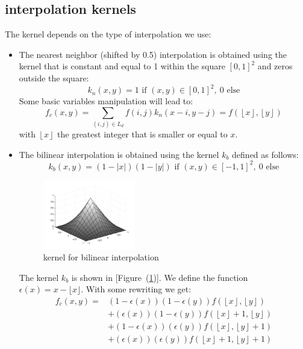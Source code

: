 \documentclass[11pt]{article}
\newcommand{\fig}[1]{[Figure~(#1)]}
\begin{document}
\subsection{interpolation kernels}

The kernel depends on the type of interpolation we use:
\begin{itemize}
\item {The nearest neighbor} (shifted by 0.5) interpolation is obtained using the kernel that is constant and equal to 1 within the square $[0,1]^2$ and zeros outside the square:
\begin{equation}
k_{n}(x,y)=1\text{ if }(x,y)\in[0,1]^2,~0\text{ else}
\label{eqn:shifted_nearest_neighbor_kernel}
\end{equation}
Some basic variables manipulation will lead to: 
\begin{equation}
f_c(x,y)=\sum_{(i,j)\in L_d} f(i,j) k_{n}(x-i,y-j)=f(\left\lfloor x\right\rfloor,\left\lfloor y\right\rfloor)
\label{eqn:shifted_nearest_neighbor}
\end{equation}
with $\left\lfloor x\right\rfloor$ the greatest integer that is smaller or equal to $x$.
\item{The bilinear interpolation} is obtained using the kernel $k_b$ defined as follows:
\begin{equation}k_b(x,y)=(1-|x|)(1-|y|)\text{ if } (x,y)\in [-1,1]^2,~0 \text{ else}
\label{eqn:bilinear_kernel}
\end{equation}
\begin{figure}[t]
\begin{center}
\includegraphics[width=4cm]{bilinear_kernel.pdf}
\caption[]{kernel for bilinear interpolation}
\label{fig:bilinear_kernel}
\end{center}
\end{figure} 


The kernel $k_b$ is shown in \fig{\ref{fig:bilinear_kernel}}. We define the function $\epsilon(x)=x-\lfloor x \rfloor$. With some rewriting we get: 
\begin{equation}
\begin{split}
f_c(x,y)=&(1-\epsilon(x))(1-\epsilon(y))f(\left\lfloor x\right\rfloor,\left\lfloor y\right\rfloor)\\&+
(\epsilon(x))(1-\epsilon(y))f(\left\lfloor x\right\rfloor+1,\left\lfloor y\right\rfloor)\\&+
(1-\epsilon(x))(\epsilon(y))f(\left\lfloor x\right\rfloor,\left\lfloor y\right\rfloor+1)\\&+
(\epsilon(x))(\epsilon(y))f(\left\lfloor x\right\rfloor+1,\left\lfloor y\right\rfloor+1)
\end{split}
\label{eqn:bilinear_interpolation}
\end{equation}
\end{itemize}
\end{document}
